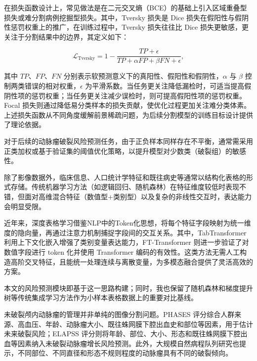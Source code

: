 在损失函数设计上，常见做法是在二元交叉熵（BCE）的基础上引入区域重叠型损失或难分割病例挖掘型损失\cite{sudre2017generaliseddice,salehi2017tversky,lin2017focal}。其中，Tversky 损失是 Dice 损失在假阳性与假阴性惩罚权重上的推广，在训练过程中，Tversky 损失往往比 Dice 损失更敏感，更关注于分割结果中的边界，其定义如下：

\begin{equation}
\mathcal{L}_{\text{Tversky}} = 1 - \frac{TP + \epsilon}{TP + \alpha FP + \beta FN + \epsilon},
\end{equation}

其中 $TP$、$FP$、$FN$ 分别表示软预测意义下的真阳性、假阳性和假阴性，$\alpha$ 与 $\beta$ 控制两类错误的相对权重，$\epsilon$ 为平滑系数。当任务更关注降低漏检时，可适当提高假阴性项的惩罚权重；当任务更关注减少误检时，则可提高假阳性项的惩罚权重。Focal 损失则通过降低易分类样本的损失贡献，使优化过程更加关注难分类体素。上述损失函数从不同角度缓解前景稀疏问题，为后续分割模型的训练目标设计提供了理论依据。

对于后续的动脉瘤破裂风险预测任务，由于正负样本同样存在不平衡，通常需采用正类加权或基于验证集的阈值优化策略，以提升模型对少数类（破裂组）的敏感性。


除了影像数据外，临床信息、人口统计学特征和既往病史等通常以结构化表格的形式存储。传统机器学习方法（如逻辑回归、随机森林）在特征维度较低时表现不错，但面对高维混合特征（数值型+类别型）以及复杂的非线性交互时，表达能力会明显受限。

近年来，深度表格学习借鉴NLP中的Token化思想，将每个特征字段映射为统一维度的隐向量，再通过注意力机制捕捉字段间的交互关系。其中，TabTransformer 利用上下文化嵌入增强了类别变量表达能力，FT-Transformer 则进一步验证了对数值字段进行 token 化并使用 Transformer 编码的有效性\cite{tabtransformer2020,fttransformer2021}。这类方法无需人工构造高阶交叉特征，且能统一处理连续与离散变量，为多模态融合提供了灵活高效的方案。

本文的风险预测模块即基于这一思路构建；同时，我也保留了随机森林和梯度提升树等传统集成学习方法作为小样本表格数据上的重要对比基线\cite{breiman2001rf,chen2016xgboost,hastie2009elements}。


未破裂颅内动脉瘤的管理并非单纯的图像分割问题。PHASES 评分综合人群来源、高血压、年龄、动脉瘤大小、既往蛛网膜下腔出血史和部位等因素，用于估计未来破裂风险\cite{greving2014}；ELAPSS 评分则将年龄、部位、大小、形态和既往蛛网膜下腔出血等因素纳入未破裂动脉瘤增长风险预测\cite{backes2017}。此外，大规模自然病程队列研究也提示，不同部位、不同直径和形态不规则程度的动脉瘤具有不同的破裂倾向\cite{morita2012,thompson2015}。

